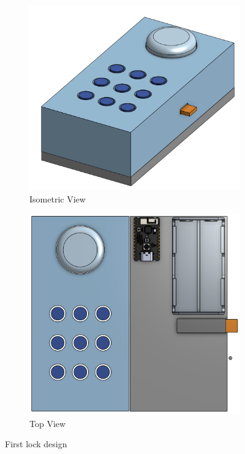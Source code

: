 \begin{figure}[htbp]
    \centering
    \begin{subfigure}[b]{0.48\textwidth}
        \includegraphics[width=\textwidth]{../submission3/img/isoView.png}
        \caption{Isometric View}
        \label{fig:isoView}
    \end{subfigure}
    \hfill
    \begin{subfigure}[b]{0.48\textwidth}
        \includegraphics[width=\textwidth]{../submission3/img/topView.png}
        \caption{Top View}
        \label{fig:topView}
    \end{subfigure}
    \caption{First lock design}
\end{figure}

